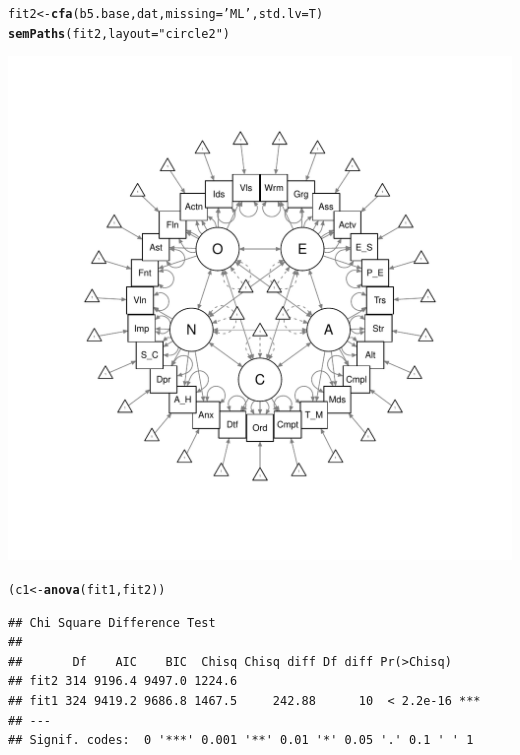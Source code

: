 \documentclass{article}\usepackage[]{graphicx}\usepackage[]{color}
\makeatletter
\def\maxwidth{ %
  \ifdim\Gin@nat@width>\linewidth
    \linewidth
  \else
    \Gin@nat@width
  \fi
}
\newcommand{\hlstr}[1]{\textcolor[rgb]{0.192,0.494,0.8}{#1}}%
\newcommand{\hlstd}[1]{\textcolor[rgb]{0.345,0.345,0.345}{#1}}%
\newcommand{\hlkwb}[1]{\textcolor[rgb]{0.69,0.353,0.396}{#1}}%
\newcommand{\hlkwc}[1]{\textcolor[rgb]{0.333,0.667,0.333}{#1}}%
\newcommand{\hlkwd}[1]{\textcolor[rgb]{0.737,0.353,0.396}{\textbf{#1}}}%
\newenvironment{kframe}{%
 \def\at@end@of@kframe{}%
 \ifinner\ifhmode%
  \def\at@end@of@kframe{\end{minipage}}%
  \begin{minipage}{\columnwidth}%
 \fi\fi%
 \def\FrameCommand##1{\hskip\@totalleftmargin \hskip-\fboxsep
 \colorbox{shadecolor}{##1}\hskip-\fboxsep
     \hskip-\linewidth \hskip-\@totalleftmargin \hskip\columnwidth}%
 \MakeFramed {\advance\hsize-\width
   \@totalleftmargin\z@ \linewidth\hsize
   \@setminipage}}%
 {\par\unskip\endMakeFramed%
 \at@end@of@kframe}
\newenvironment{knitrout}{}{} %
\makeatother
\begin{document}
\begin{knitrout}
\color{fgcolor}\begin{kframe}
\begin{alltt}
\hlstd{fit2} \hlkwb{<-} \hlkwd{cfa}\hlstd{(b5.base, dat,} \hlkwc{missing} \hlstd{=} \hlstr{'ML'}\hlstd{,} \hlkwc{std.lv} \hlstd{= T)}
\hlkwd{semPaths}\hlstd{(fit2,} \hlkwc{layout} \hlstd{=} \hlstr{"circle2"}\hlstd{)}
\end{alltt}
\end{kframe}
\includegraphics[width=\maxwidth]{figure/unnamed-chunk-6-1} 
\begin{kframe}\begin{alltt}
\hlstd{(c1} \hlkwb{<-} \hlkwd{anova}\hlstd{(fit1, fit2))}
\end{alltt}
\begin{verbatim}
## Chi Square Difference Test
## 
##       Df    AIC    BIC  Chisq Chisq diff Df diff Pr(>Chisq)    
## fit2 314 9196.4 9497.0 1224.6                                  
## fit1 324 9419.2 9686.8 1467.5     242.88      10  < 2.2e-16 ***
## ---
## Signif. codes:  0 '***' 0.001 '**' 0.01 '*' 0.05 '.' 0.1 ' ' 1
\end{verbatim}
\end{kframe}
\end{knitrout}
\end{document}
